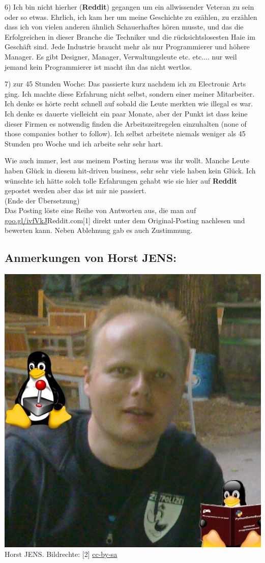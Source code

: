 6) Ich bin nicht hierher (\textbf{Reddit}) gegangen um ein allwissender Veteran zu sein oder so etwas. Ehrlich, ich kam her um meine Geschichte zu ezählen, zu erzählen dass ich von vielen anderen ähnlich Schauerhaftes hören musste, und das die Erfolgreichen in dieser Branche die Techniker und die rücksichtslosesten Haie im Geschäft sind. Jede Industrie braucht mehr als nur Programmierer und höhere Manager. Es gibt Designer, Manager, Verwaltungsleute etc. etc.... nur weil jemand kein Programmierer ist macht ihn das nicht wertlos.
 
7) zur 45 Stunden Woche: Das passierte kurz nachdem ich zu Electronic Arts ging. Ich machte diese Erfahrung nicht selbst, sondern einer meiner Mitarbeiter. Ich denke es hörte recht schnell auf sobald die Leute merkten wie illegal es war. Ich denke es dauerte vielleicht ein paar Monate, aber der Punkt ist dass keine dieser Firmen es notwendig finden die Arbeitszeitregelen einzuhalten (none of those companies bother to follow). Ich selbst arbeitete niemals weniger als 45 Stunden pro Woche und ich arbeite sehr sehr hart. 

Wie auch immer, lest aus meinem Posting heraus was ihr wollt. Manche Leute haben Glück in diesem hit-driven business, sehr sehr viele haben kein Glück. Ich wünschte ich hätte solch tolle Erfahrungen gehabt wie sie hier auf \textbf{Reddit} gepostet werden aber das ist mir nie passiert. \\

(Ende der Übersetzung) \\

Das Posting löste eine Reihe von Antworten aus, die man auf \href{http://www.reddit.com/r/gamedev/comments/z83h2/the_games_industry_is_a_scam_and_this_is_why_you}{goo.gl/ivfVkJ}{Reddit.com}[1] direkt unter dem Original-Posting nachlesen und bewerten kann. Neben Ablehnung gab es auch Zustimmung.

\subsection*{Anmerkungen von Horst JENS:}
\begin{center}
\includegraphics[width=0.6\linewidth]{redditrant/horst2011mitdoppeltux.jpg} \\
\footnotesize{Horst JENS. Bildrechte: [2] \href{http://creativecommons.org/licenses/by-sa/4.0/deed.de}{cc-by-sa}}
\end{center}

